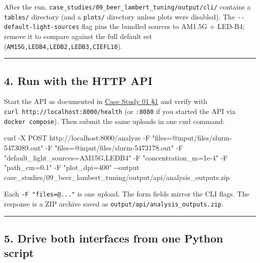 \documentclass[
  11pt,
]{article}
\newenvironment{Shaded}{}{}
\newcommand{\AttributeTok}[1]{\textcolor[rgb]{0.49,0.56,0.16}{#1}}
\newcommand{\ExtensionTok}[1]{#1}
\newcommand{\NormalTok}[1]{#1}
\newcommand{\StringTok}[1]{\textcolor[rgb]{0.25,0.44,0.63}{#1}}
\begin{document}
After the run,
\texttt{case\_studies/09\_beer\_lambert\_tuning/output/cli/} contains a
\texttt{tables/} directory (and a \texttt{plots/} directory unless plots
were disabled). The \texttt{-\/-default-light-sources} flag pins the
bundled sources to AM1.5G + LED-B4; remove it to compare against the
full default set (\texttt{AM15G,LEDB4,LEDB2,LEDB3,CIEFL10}).

\begin{center}\rule{0.5\linewidth}{0.5pt}\end{center}

\hypertarget{4-run-with-the-http-api}{
\subsection{4. Run with the HTTP API}\label{4-run-with-the-http-api}}

Start the API as documented in
\href{https://github.com/pinarsyt/overlap-calculator/blob/main/case_studies/01_theoretical_only/README.md\#1-prerequisites}{Case
Study 01 §1} and verify with
\texttt{curl\ http://localhost:8000/health} (or \texttt{:8080} if you
started the API via \texttt{docker\ compose}). Then submit the same
uploads in one curl command:

\begin{Shaded}
\begin{Highlighting}[]
\ExtensionTok{curl} \AttributeTok{{-}X}\NormalTok{ POST http://localhost:8000/analyze }\AttributeTok{{-}F} \StringTok{"files=@input/files/slurm{-}5473089.out"} \AttributeTok{{-}F} \StringTok{"files=@input/files/slurm{-}5473178.out"} \AttributeTok{{-}F} \StringTok{"default\_light\_sources=AM15G,LEDB4"} \AttributeTok{{-}F} \StringTok{"concentration\_m=1e{-}4"} \AttributeTok{{-}F} \StringTok{"path\_cm=0.1"} \AttributeTok{{-}F} \StringTok{"plot\_dpi=400"} \AttributeTok{{-}{-}output}\NormalTok{ case\_studies/09\_beer\_lambert\_tuning/output/api/analysis\_outputs.zip}
\end{Highlighting}
\end{Shaded}

Each \texttt{-F\ "files=@..."} is one upload. The form fields mirror the
CLI flags. The response is a ZIP archive saved as
\texttt{output/api/analysis\_outputs.zip}.

\begin{center}\rule{0.5\linewidth}{0.5pt}\end{center}

\hypertarget{5-drive-both-interfaces-from-one-python-script}{
\subsection{5. Drive both interfaces from one Python
script}\label{5-drive-both-interfaces-from-one-python-script}}
\end{document}
